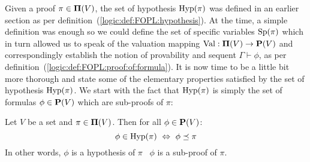 Given a proof $\pi\in\mbox{${\bf\Pi}(V)$}$, the set of hypothesis $\mbox{\rm Hyp}(\pi)$ was
defined in an earlier section as per
definition~(\ref{logic:def:FOPL:hypothesis}). At the time, a simple
definition was enough so we could define the set of specific
variables $\mbox{\rm Sp}(\pi)$ which in turn allowed us to speak of the
valuation mapping $\mbox{\rm Val}:\mbox{${\bf\Pi}(V)$}\to\mbox{${\bf P}(V)$}$ and correspondingly establish
the notion of provability and sequent $\Gamma\vdash\phi$, as per
definition~(\ref{logic:def:FOPL:proof:of:formula}). It is now time
to be a little bit more thorough and state some of the elementary
properties satisfied by the set of hypothesis $\mbox{\rm Hyp}(\pi)$. We start
with the fact that $\mbox{\rm Hyp}(\pi)$ is simply the set of formulas
$\phi\in\mbox{${\bf P}(V)$}$ which are sub-proofs of $\pi$:
\begin{prop}\label{logic:prop:FUAP:hypothesis:charac}
Let $V$ be a set and $\pi\in\mbox{${\bf\Pi}(V)$}$. Then for all $\phi\in\mbox{${\bf P}(V)$}$:
    \[
    \phi\in\hyp(\pi)\ \Leftrightarrow\ \phi\preceq\pi
    \]
In other words, $\phi$ is a hypothesis of $\pi$ \ifand\ $\phi$ is a
sub-proof of $\pi$.
\end{prop}
